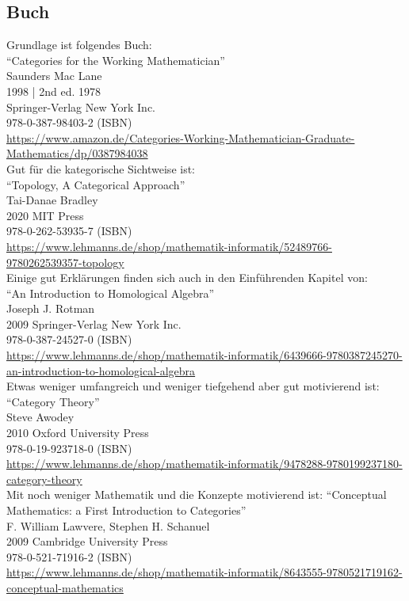 \documentclass[a4paper]{amsart}
\theoremstyle{definition}
\begin{document}
\subsection*{Buch}
Grundlage ist folgendes Buch:\\
"`Categories for the Working Mathematician"'\\
Saunders Mac Lane\\
1998 | 2nd ed. 1978\\
Springer-Verlag New York Inc.\\
978-0-387-98403-2 (ISBN)\\
{\tiny
   \url{https://www.amazon.de/Categories-Working-Mathematician-Graduate-Mathematics/dp/0387984038}}\\

Gut für die kategorische Sichtweise ist:\\
"`Topology, A Categorical Approach"'\\
Tai-Danae Bradley\\
2020 MIT Press\\
978-0-262-53935-7 (ISBN)\\
{\tiny
\url{https://www.lehmanns.de/shop/mathematik-informatik/52489766-9780262539357-topology}}\\

Einige gut Erklärungen finden sich auch in den Einführenden Kapitel von:\\
"`An Introduction to Homological Algebra"'\\
Joseph J. Rotman\\
2009 Springer-Verlag New York Inc.\\
978-0-387-24527-0 (ISBN)\\
{\tiny \url{https://www.lehmanns.de/shop/mathematik-informatik/6439666-9780387245270-an-introduction-to-homological-algebra}}\\

Etwas weniger umfangreich und weniger tiefgehend aber gut motivierend ist:
"`Category Theory"'\\
Steve Awodey\\
2010 Oxford University Press\\
978-0-19-923718-0 (ISBN)\\
{\tiny\url{https://www.lehmanns.de/shop/mathematik-informatik/9478288-9780199237180-category-theory}}\\

Mit noch weniger Mathematik und die Konzepte motivierend ist:
"`Conceptual Mathematics: a First Introduction to Categories"'\\
F. William Lawvere, Stephen H. Schanuel\\
2009 Cambridge University Press\\
978-0-521-71916-2 (ISBN)\\
{\tiny\url{https://www.lehmanns.de/shop/mathematik-informatik/8643555-9780521719162-conceptual-mathematics}}
\end{document}
